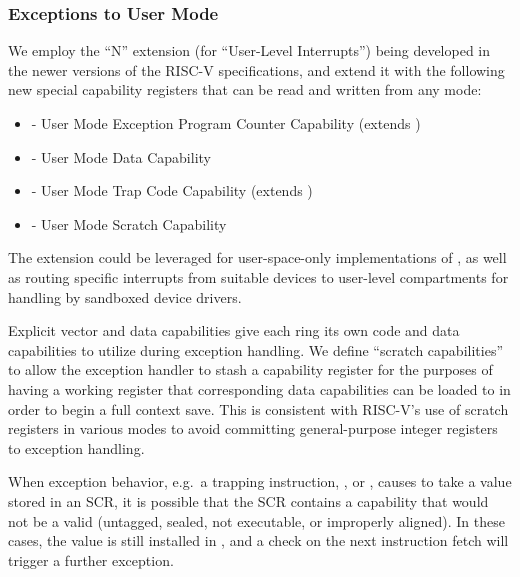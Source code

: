 \subsubsection{Exceptions to User Mode}

We employ the ``N'' extension (for ``User-Level Interrupts'') being developed in
the newer versions of the RISC-V specifications, and extend it with the following
new special capability registers that can be read and written from any mode:

\begin{itemize}
\item \UEPCC{} - User Mode Exception Program Counter Capability (extends
  \uepc{})
\item \UTDC{} - User Mode Data Capability
\item \UTCC{} - User Mode Trap Code Capability (extends \utvec{})
\item \UScratchC{} - User Mode Scratch Capability
\end{itemize}

The extension could be leveraged for user-space-only implementations
of , as well as routing specific interrupts from
suitable devices to user-level compartments for handling by sandboxed
device drivers.

Explicit vector and data capabilities give each ring its
own code and data capabilities to utilize during exception handling.
We define ``scratch capabilities'' to allow the exception handler to stash a
capability register for the purposes of having a working register that
corresponding data capabilities can be loaded to in order to begin a full
context save.
This is consistent with RISC-V's use of scratch registers in various modes to
avoid committing general-purpose integer registers to exception handling.

When exception behavior, e.g.\ a trapping instruction, ,
or \xRET{}, causes \PCC{} to take a value stored in an SCR, it is possible that
the SCR contains a capability that would not be a valid \PCC{} (untagged,
sealed, not executable, or improperly aligned).
In these cases, the value is still installed in \PCC{}, and a check on the next
instruction fetch will trigger a further exception.

